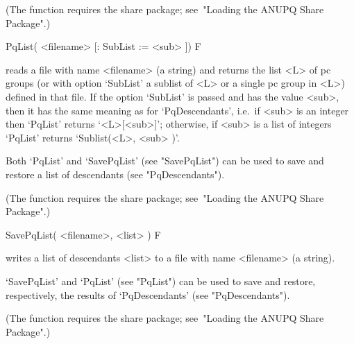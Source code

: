 (The function requires the {\ANUPQ} share package; see~"Loading the ANUPQ
Share Package".)

\>PqList( <filename> [: SubList := <sub> ]) F

reads a file with name <filename> (a string) and returns the list <L>  of
pc groups (or with option `SubList' a sublist of <L> or a single pc group
in <L>) defined in that file. If the option `SubList' is passed  and  has
the value <sub>, then it has the same  meaning  as  for  `PqDescendants',
i.e.~if  <sub>  is  an  integer  then  `PqList'   returns   `<L>[<sub>]';
otherwise, if <sub> is a list of integers `PqList' returns  `Sublist(<L>,
<sub> )'.

Both `PqList' and `SavePqList' (see "SavePqList") can be used to save and
restore a list of descendants (see "PqDescendants").

(The function requires the {\ANUPQ} share package; see~"Loading the ANUPQ
Share Package".)

\>SavePqList( <filename>, <list> ) F

writes a list of descendants <list> to a file  with  name  <filename>  (a
string).

`SavePqList' and `PqList' (see "PqList") can be used to save and restore,
respectively, the results of `PqDescendants' (see "PqDescendants").

(The function requires the {\ANUPQ} share package; see~"Loading the ANUPQ
Share Package".)

